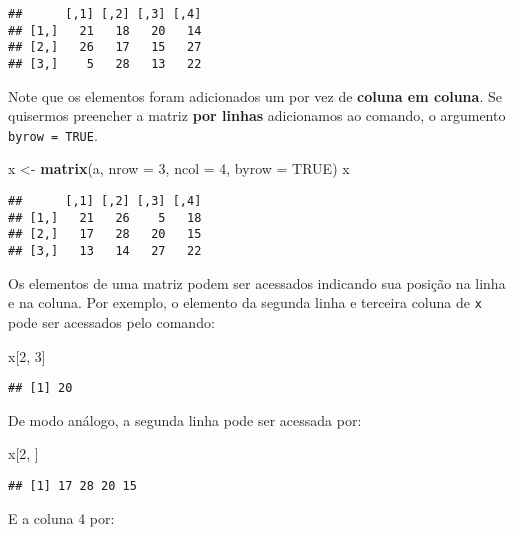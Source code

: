 \documentclass[
]{book}
\newenvironment{Shaded}{\begin{snugshade}}{\end{snugshade}}
\newcommand{\DataTypeTok}[1]{\textcolor[rgb]{0.13,0.29,0.53}{#1}}
\newcommand{\DecValTok}[1]{\textcolor[rgb]{0.00,0.00,0.81}{#1}}
\newcommand{\KeywordTok}[1]{\textcolor[rgb]{0.13,0.29,0.53}{\textbf{#1}}}
\newcommand{\NormalTok}[1]{#1}
\newcommand{\OtherTok}[1]{\textcolor[rgb]{0.56,0.35,0.01}{#1}}
\newcommand{\StringTok}[1]{\textcolor[rgb]{0.31,0.60,0.02}{#1}}
\begin{document}
\begin{verbatim}
##      [,1] [,2] [,3] [,4]
## [1,]   21   18   20   14
## [2,]   26   17   15   27
## [3,]    5   28   13   22
\end{verbatim}

Note que os elementos foram adicionados um por vez de \textbf{coluna em coluna}. Se quisermos preencher a matriz \textbf{por linhas} adicionamos ao comando, o argumento \texttt{byrow\ =\ TRUE}.

\begin{Shaded}
\begin{Highlighting}[]
\NormalTok{x <-}\StringTok{ }\KeywordTok{matrix}\NormalTok{(a, }\DataTypeTok{nrow =} \DecValTok{3}\NormalTok{, }\DataTypeTok{ncol =} \DecValTok{4}\NormalTok{, }\DataTypeTok{byrow =} \OtherTok{TRUE}\NormalTok{)}
\NormalTok{x}
\end{Highlighting}
\end{Shaded}

\begin{verbatim}
##      [,1] [,2] [,3] [,4]
## [1,]   21   26    5   18
## [2,]   17   28   20   15
## [3,]   13   14   27   22
\end{verbatim}

Os elementos de uma matriz podem ser acessados indicando sua posição na linha e na coluna. Por exemplo, o elemento da segunda linha e terceira coluna de \texttt{x} pode ser acessados pelo comando:

\begin{Shaded}
\begin{Highlighting}[]
\NormalTok{x[}\DecValTok{2}\NormalTok{, }\DecValTok{3}\NormalTok{]}
\end{Highlighting}
\end{Shaded}

\begin{verbatim}
## [1] 20
\end{verbatim}

De modo análogo, a segunda linha pode ser acessada por:

\begin{Shaded}
\begin{Highlighting}[]
\NormalTok{x[}\DecValTok{2}\NormalTok{, ]}
\end{Highlighting}
\end{Shaded}

\begin{verbatim}
## [1] 17 28 20 15
\end{verbatim}

E a coluna 4 por:
\end{document}
